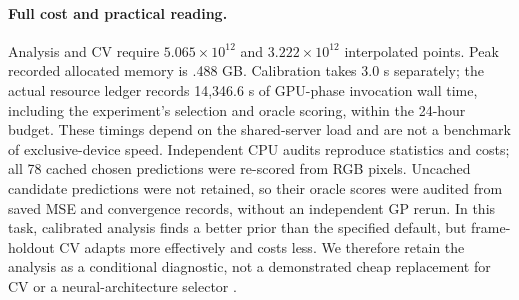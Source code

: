 \paragraph{Full cost and practical reading.} Analysis and CV require
$5.065\times10^{12}$ and $3.222\times10^{12}$ interpolated points. Peak
recorded allocated memory is .488 GB. Calibration takes 3.0 s separately;
the actual resource ledger records 14,346.6 s of GPU-phase invocation wall
time, including the experiment's selection and oracle scoring, within the
24-hour budget. These timings depend on the shared-server load and are
not a benchmark of exclusive-device speed. Independent CPU audits reproduce
statistics and costs; all 78 cached chosen predictions were re-scored
from RGB pixels. Uncached candidate predictions were not retained, so
their oracle scores were audited from saved MSE and convergence records,
without an independent GP rerun. In this task, calibrated analysis finds
a better prior than the specified default, but frame-holdout CV adapts
more effectively and costs less. We therefore retain the analysis as a
conditional diagnostic, not a demonstrated cheap replacement for CV or
a neural-architecture selector .

